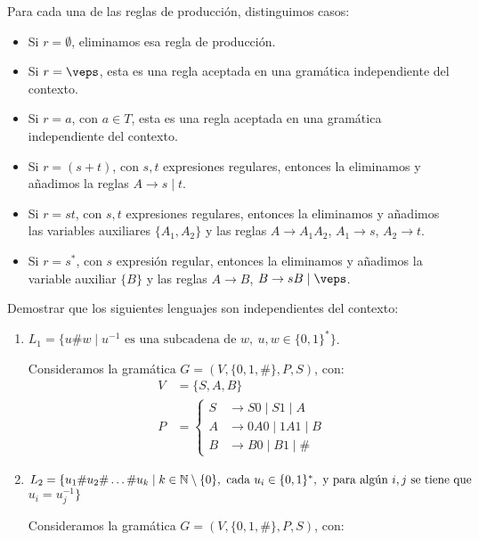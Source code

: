 \begin{ejercicio}
\begin{description}
        Para cada una de las reglas de producción, distinguimos casos:
        \begin{itemize}
            \item Si $r=\emptyset$, eliminamos esa regla de producción.
            \item Si $r=\veps$, esta es una regla aceptada en una gramática independiente del contexto.
            \item Si $r=a$, con $a\in T$, esta es una regla aceptada en una gramática independiente del contexto.
            \item Si $r=(s+t)$, con $s,t$ expresiones regulares, entonces la eliminamos y añadimos la reglas $A\to s\mid t$.
            \item Si $r=st$, con $s,t$ expresiones regulares, entonces la eliminamos y añadimos las variables auxiliares $\{A_1,A_2\}$ y las reglas $A\to A_1A_2$, $A_1\to s$, $A_2\to t$.
            \item Si $r=s^*$, con $s$ expresión regular, entonces la eliminamos y añadimos la variable auxiliar $\{B\}$ y las reglas $A\to B$, $B\to sB\mid \veps$.
        \end{itemize}
    \end{description}
\end{ejercicio}

\begin{ejercicio}\label{ej:1.4.16}
    Demostrar que los siguientes lenguajes son independientes del contexto:
    \begin{enumerate}
        \item $L_1 = \{ u \# w \mid u^{-1} \text{ es una subcadena de } w,~u, w \in \{ 0, 1 \}^* \}$.
        
        Consideramos la gramática $G=(V,\{0,1,\#\},P,S)$, con:
        \begin{equation*}
            \begin{aligned}
                V &= \{ S, A, B\} \\
                P &= \left\{
                    \begin{aligned}
                        S &\rightarrow S0 \mid S1\mid A \\
                        A & \rightarrow 0A0 \mid 1A1 \mid B \\
                        B &\rightarrow B0 \mid B1 \mid \#
                    \end{aligned}
                \right.
            \end{aligned}
        \end{equation*}
        \item $L_2 = \{ u_1 \# u_2 \# \ldots \# u_k \mid k\in \mathbb{N}\setminus \{0\}, \text{ cada } u_i \in \{ 0, 1 \}^*, \text{ y para algún } i,j \text{ se tiene que }$ $u_i=u_j^{-1} \}$
        
        Consideramos la gramática $G=(V,\{0,1,\#\},P,S)$, con:
    \end{enumerate}
\end{ejercicio}

